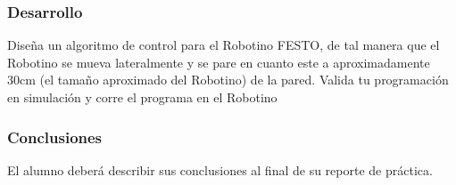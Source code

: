\begin{frame}
	\frametitle{Desarrollo}
	Diseña un algoritmo de control para el Robotino FESTO, de tal manera que el Robotino se mueva lateralmente y se pare en cuanto este a aproximadamente 30cm (el tamaño aproximado del Robotino) de la pared. Valida tu programación en simulación y corre el programa en el Robotino
\end{frame}
\begin{frame}
	\frametitle{Conclusiones}
	El alumno deberá describir sus conclusiones al final de su reporte de práctica.
\end{frame}

